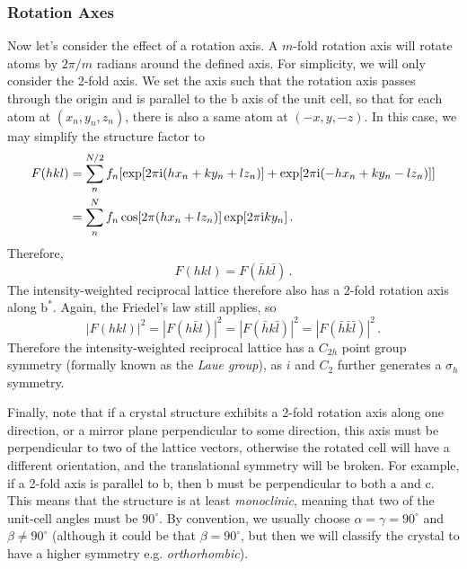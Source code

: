 \documentclass{article}
\theoremstyle{plain}\theoremheaderfont{\normalfont\itshape}\theorembodyfont{\rmfamily}\theoremseparator{.}\newtheorem*{rem}{Remark}\newtheorem*{ex}{Example}\newtheorem*{proof}{Proof}\newtheorem*{altp}{Alternative proof}
\theoremstyle{plain}\theoremheaderfont{\normalfont\bfseries}\theorembodyfont{\rmfamily}\theoremseparator{.}\newtheorem{thm}{Theorem}[section]\newtheorem{lem}[thm]{Lemma}\newtheorem{prop}[thm]{Proposition}\newtheorem*{cor}{Corollary}\newtheorem{defn}[thm]{Definition}\newtheorem{clm}[thm]{Claim}\newtheorem{clminproof}{Claim}\newtheorem*{law}{Law}\newtheorem{pos}[thm]{Postulate}
\theoremstyle{break}\theoremheaderfont{\normalfont\itshape}\theorembodyfont{\rmfamily}\theoremseparator{.\medskip}\newtheorem*{proofskip}{Proof}\newtheorem*{exs}{Examples}\newtheorem*{rems}{Remarks}
\theoremstyle{break}\theoremheaderfont{\normalfont\bfseries}\theorembodyfont{\rmfamily}\theoremseparator{.\medskip}\newtheorem{lemskip}[thm]{Lemma}\newtheorem{defnskip}[thm]{Definition}\newtheorem{propskip}[thm]{Proposition}\newtheorem{thmskip}[thm]{Theorem}
\numberwithin{equation}{section}
\newcommand{\ii}{\mathrm{i}}
\newcommand{\vb}[1]{\bm{\mathrm{#1}}}
\newcommand{\abs}[1]{\left| #1 \right|}
\begin{document}
    \subsubsection{Rotation Axes}
    Now let's consider the effect of a rotation axis. A \(m\)-fold rotation axis will rotate atoms by \(2\pi/m\) radians around the defined axis. For simplicity, we will only consider the 2-fold axis. We set the axis such that the rotation axis passes through the origin and is parallel to the \(\vb{b}\) axis of the unit cell, so that for each atom at \((x_n,y_n,z_n)\), there is also a same atom at \((-x,y,-z)\). In this case, we may simplify the structure factor to
    \begin{align}
        F(hkl)&=\sum_{n}^{N/2}f_n[\exp[2\pi \ii(hx_n+ky_n+lz_n)]+\exp[2\pi \ii(-hx_n+ky_n-lz_n)]]\notag \\
        &=\sum_{n}^{N}f_n\cos[2\pi(hx_n+lz_n)]\exp[2\pi \ii ky_n]\,.
    \end{align}
    Therefore,
    \begin{equation}
        F(hkl)=F(\bar{h}k\bar{l})\,.
    \end{equation}
    The intensity-weighted reciprocal lattice therefore also has a 2-fold rotation axis along \(\vb{b}^*\). Again, the Friedel's law still applies, so
    \begin{equation}
        \abs{F(hkl)}^2=\abs{F(h\bar{k}l)}^2=\abs{F(\bar{h}k\bar{l})}^2=\abs{F(\bar{h}\bar{k}\bar{l})}^2\,.
    \end{equation}
    Therefore the intensity-weighted reciprocal lattice has a \(C_{2h}\) point group symmetry (formally known as the \textit{Laue group}), as \(i\) and \(C_2\) further generates a \(\sigma_h\) symmetry.

    Finally, note that if a crystal structure exhibits a 2-fold rotation axis along one direction, or a mirror plane perpendicular to some direction, this axis must be perpendicular to two of the lattice vectors, otherwise the rotated cell will have a different orientation, and the translational symmetry will be broken. For example, if a 2-fold axis is parallel to \(\vb{b}\), then \(\vb{b}\) must be perpendicular to both \(\vb{a}\) and \(\vb{c}\). This means that the structure is at least \textit{monoclinic}, meaning that two of the unit-cell angles must be \(90^\circ\). By convention, we usually choose \(\alpha=\gamma=90^\circ\) and \(\beta\ne 90^\circ\) (although it could be that \(\beta=90^\circ\), but then we will classify the crystal to have a higher symmetry e.g. \textit{orthorhombic}).
\end{document}
